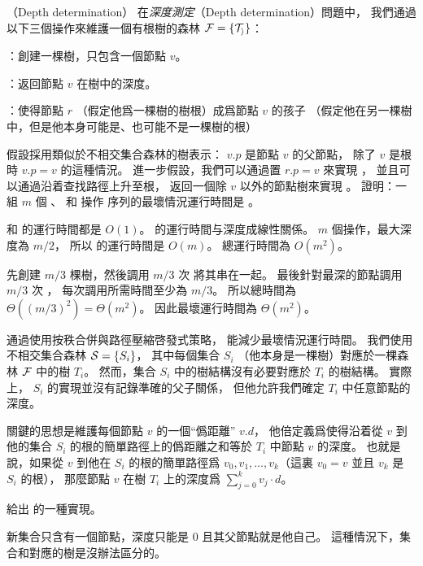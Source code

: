 \startPROBLEM
（Depth determination）
在\emph{深度測定}（Depth determination）問題中，
我們通過以下三個操作來維護一個有根樹的森林 $\cal{F} = \{T_i\}$：

：創建一棵樹，只包含一個節點 $v$。

：返回節點 $v$ 在樹中的深度。

：使得節點 $r$ （假定他爲一棵樹的樹根）成爲節點 $v$ 的孩子
（假定他在另一棵樹中，但是他本身可能是、也可能不是一棵樹的根）

\startigBase[a]\startitem
假設採用類似於不相交集合森林的樹表示：
 $v.p$ 是節點 $v$ 的父節點，
除了 $v$ 是根時 $v.p = v$ 的這種情況。
進一步假設，我們可以通過置 $r.p=v$ 來實現 ，
並且可以通過沿着查找路徑上升至根，
返回一個除 $v$ 以外的節點樹來實現 。
證明：一組 $m$ 個 、  和  操作
序列的最壞情況運行時間是 。
\stopitem\stopigBase

\startANSWER
{} 和  的運行時間都是 $O(1)$。
 的運行時間与深度成線性關係。
$m$ 個操作，最大深度為 $m/2$，
所以  的運行時間是 $O(m)$。
總運行時間為 $O(m^2)$。

先創建 $m/3$ 棵樹，然後調用 $m/3$ 次  將其串在一起。
最後針對最深的節點調用 $m/3$ 次 ，
每次調用所需時間至少為 $m/3$。
所以總時間為 $\Theta((m/3)^2) = \Theta(m^2)$。
因此最壞運行時間為 $\Theta(m^2)$。
\stopANSWER

通過使用按秩合併與路徑壓縮啓發式策略，
能減少最壞情況運行時間。
我們使用不相交集合森林 ${\cal{S}} = \{S_i\}$，
其中每個集合 $S_i$ （他本身是一棵樹）對應於一棵森林 $\cal{F}$ 中的樹 $T_i$。
然而，集合 $S_i$ 中的樹結構沒有必要對應於 $T_i$ 的樹結構。
實際上， $S_i$ 的實現並沒有記錄準確的父子關係，
但他允許我們確定 $T_i$ 中任意節點的深度。

關鍵的思想是維護每個節點 $v$ 的一個“僞距離” $v.d$，
他倍定義爲使得沿着從 $v$ 到他的集合 $S_i$ 的根的簡單路徑上的僞距離之和等於 $T_i$ 中節點 $v$ 的深度。
也就是說，如果從 $v$ 到他在 $S_i$ 的根的簡單路徑爲 $v_0,v_1,\ldots,v_k$（這裏 $v_0=v$ 並且 $v_k$ 是 $S_i$ 的根），
那麼節點 $v$ 在樹 $T_i$ 上的深度爲 $\sum_{j=0}^{k}v_j\cdot d$。

\startigBase[continue]\startitem
給出  的一種實現。
\stopitem\stopigBase

\startANSWER
新集合只含有一個節點，深度只能是 0 且其父節點就是他自己。
這種情況下，集合和對應的樹是沒辦法區分的。

